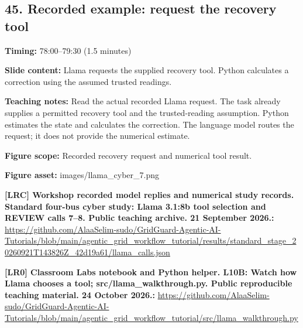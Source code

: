 \documentclass[10pt,letterpaper]{article}
\begin{document}
\subsection*{45. Recorded example: request the recovery tool}
\textbf{Timing:} 78:00--79:30 (1.5 minutes)\par
\textbf{Slide content:} Llama requests the supplied recovery tool.
Python calculates a correction using the assumed trusted readings.\par
\textbf{Teaching notes:} Read the actual recorded Llama request. The task already supplies a permitted recovery tool and the trusted-reading assumption. Python estimates the state and calculates the correction. The language model routes the request; it does not provide the numerical estimate.\par
\textbf{Figure scope:} Recorded recovery request and numerical tool result.\par
\textbf{Figure asset:} images/llama\_cyber\_7.png\par
\textbf{[LRC] Workshop recorded model replies and numerical study records. Standard four-bus cyber study: Llama 3.1:8b tool selection and REVIEW calls 7--8. Public teaching archive. 21 September 2026.:} \href{https://github.com/AlaaSelim-sudo/GridGuard-Agentic-AI-Tutorials/blob/main/agentic_grid_workflow_tutorial/results/standard_stage_20260921T143826Z_42d19a61/llama_calls.json}{\small\ttfamily https:/\allowbreak{}/\allowbreak{}github.\allowbreak{}com/\allowbreak{}AlaaSelim-\allowbreak{}sudo/\allowbreak{}GridGuard-\allowbreak{}Agentic-\allowbreak{}AI-\allowbreak{}Tutorials/\allowbreak{}blob/\allowbreak{}main/\allowbreak{}agentic\_\allowbreak{}grid\_\allowbreak{}workflow\_\allowbreak{}tutorial/\allowbreak{}results/\allowbreak{}standard\_\allowbreak{}stage\_\allowbreak{}20260921T143826Z\_\allowbreak{}42d19a61/\allowbreak{}llama\_\allowbreak{}calls.\allowbreak{}json}\par
\textbf{[LR0] Classroom Labs notebook and Python helper. L10B: Watch how Llama chooses a tool; src/llama\_walkthrough.py. Public reproducible teaching material. 24 October 2026.:} \href{https://github.com/AlaaSelim-sudo/GridGuard-Agentic-AI-Tutorials/blob/main/agentic_grid_workflow_tutorial/src/llama_walkthrough.py}{\small\ttfamily https:/\allowbreak{}/\allowbreak{}github.\allowbreak{}com/\allowbreak{}AlaaSelim-\allowbreak{}sudo/\allowbreak{}GridGuard-\allowbreak{}Agentic-\allowbreak{}AI-\allowbreak{}Tutorials/\allowbreak{}blob/\allowbreak{}main/\allowbreak{}agentic\_\allowbreak{}grid\_\allowbreak{}workflow\_\allowbreak{}tutorial/\allowbreak{}src/\allowbreak{}llama\_\allowbreak{}walkthrough.\allowbreak{}py}\par
\par\medskip
\end{document}
